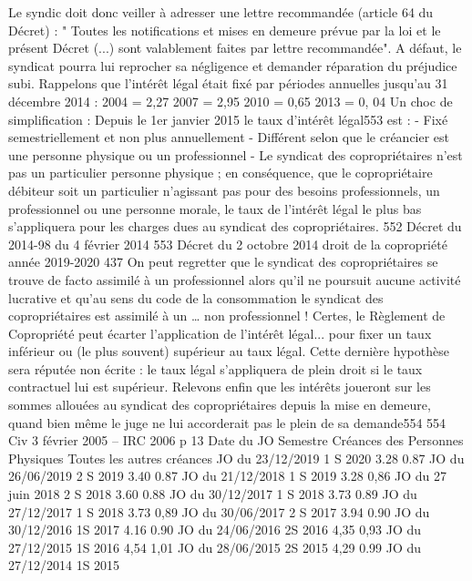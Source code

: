 Le syndic doit donc veiller à adresser une lettre recommandée (article 64 du Décret) : "
Toutes les notifications et mises en demeure prévue par la loi et le présent Décret (...) sont valablement faites par lettre recommandée".
A défaut, le syndicat pourra lui reprocher sa négligence et demander réparation du préjudice subi.
Rappelons que l’intérêt légal était fixé par périodes annuelles jusqu’au 31 décembre 2014 :
2004 = 2,27 %
2007 = 2,95 %
2010 = 0,65 %
2013 = 0, 04 %
\degres Un choc de simplification :
Depuis le 1er janvier 2015 le taux d’intérêt légal553 est :
- Fixé semestriellement et non plus annuellement
- Différent selon que le créancier est une personne physique ou un professionnel
- Le syndicat des copropriétaires n’est pas un particulier personne physique ; en conséquence, que le copropriétaire débiteur soit un particulier n’agissant pas pour des besoins professionnels, un professionnel ou une personne morale, le taux de l’intérêt légal le plus bas s’appliquera pour les charges dues au syndicat des copropriétaires.
552 Décret du 2014-98 du 4 février 2014 553 Décret du 2 octobre 2014
droit de la copropriété année 2019-2020
437
On peut regretter que le syndicat des copropriétaires se trouve de facto assimilé à un professionnel alors qu’il ne poursuit aucune activité lucrative et qu’au sens du code de la consommation le syndicat des copropriétaires est assimilé à un … non professionnel !
Certes, le Règlement de Copropriété peut écarter l'application de l'intérêt légal... pour fixer un taux inférieur ou (le plus souvent) supérieur au taux légal. Cette dernière hypothèse sera réputée non écrite : le taux légal s’appliquera de plein droit si le taux contractuel lui est supérieur.
Relevons enfin que les intérêts joueront sur les sommes allouées au syndicat des copropriétaires depuis la mise en demeure, quand bien même le juge ne lui accorderait pas le plein de sa demande554
554 Civ 3 février 2005 – IRC 2006  p 13
Date du JO
Semestre
Créances des
Personnes Physiques
Toutes les autres
créances
JO du 23/12/2019
1 S 2020
3.28 %
0.87 %
JO du 26/06/2019
2 S 2019
3.40%
0.87 %
JO du 21/12/2018
1 S 2019
3.28 %
0,86 %
JO du 27 juin 2018
2 S 2018
3.60%
0.88%
JO du 30/12/2017
1 S 2018
3.73%
0.89%
JO du 27/12/2017
1 S 2018
3.73%
0,89%
JO du 30/06/2017
2 S 2017
3.94%
0.90%
JO du 30/12/2016
1S 2017
4.16 %
0.90 %
JO du 24/06/2016
2S 2016
4,35 %
0,93 %
JO du 27/12/2015
1S 2016
4,54 %
1,01 %
JO du 28/06/2015
2S 2015
4,29 %
0.99 %
JO du 27/12/2014
1S 2015
